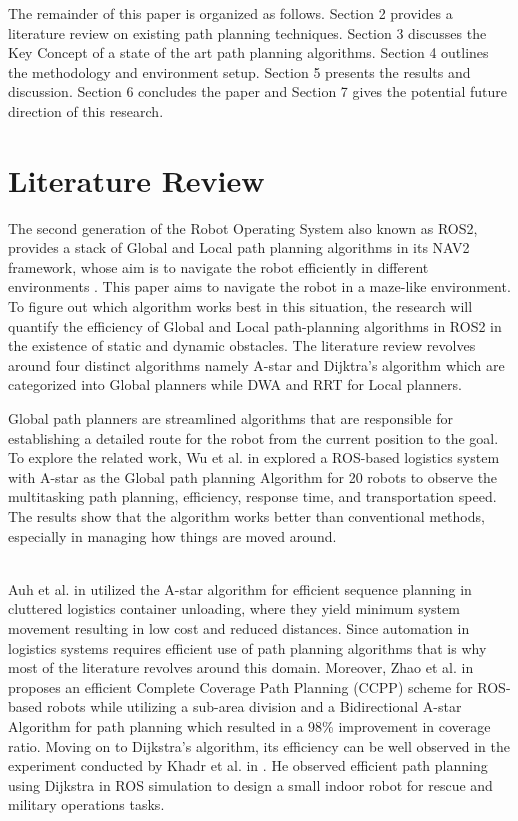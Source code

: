 \documentclass[sigconf]{acmart}
\begin{document}
The remainder of this paper is organized as follows. Section 2 provides a literature review on existing path planning techniques. Section 3 discusses the Key Concept of a state of the art path planning algorithms. Section 4 outlines the methodology and environment setup. Section 5 presents the results and discussion. Section 6 concludes the paper and Section 7 gives the potential future direction of this research.
\section{Literature Review}

The second generation of the Robot Operating System also known as ROS2, provides a stack of Global and Local path planning algorithms in its NAV2 framework, whose aim is to navigate the robot efficiently in different environments \cite{b14}. This paper aims to navigate the robot in a maze-like environment. To figure out which algorithm works best in this situation, the research will quantify the efficiency of Global and Local path-planning algorithms in ROS2 in the existence of static and dynamic obstacles. The literature review revolves around four distinct algorithms namely A-star and Dijktra's algorithm which are categorized into Global planners while DWA and RRT for Local planners.  

Global path planners are streamlined algorithms that are responsible for establishing a detailed route for the robot from the current position to the goal. To explore the related work, Wu et al. in \cite{b1} explored a ROS-based logistics system with A-star as the Global path planning Algorithm for 20 robots to observe the multitasking path planning, efficiency, response time, and transportation speed. The results show that the algorithm works better than conventional methods, especially in managing how things are moved around. 

\\
Auh et al. in \cite{b2} utilized the A-star algorithm for efficient sequence planning in cluttered logistics container unloading, where they yield minimum system movement resulting in low cost and reduced distances. Since automation in logistics systems requires efficient use of path planning algorithms that is why most of the literature revolves around this domain. Moreover, Zhao et al. in \cite{b3} proposes an efficient Complete Coverage Path Planning (CCPP) scheme for ROS-based robots while utilizing a sub-area division and a Bidirectional A-star Algorithm for path planning which resulted in a 98\% improvement in coverage ratio. Moving on to Dijkstra's algorithm, its efficiency can be well observed in the experiment conducted by Khadr et al. in \cite{b4}. He observed efficient path planning using Dijkstra in ROS simulation to design a small indoor robot for rescue and military operations tasks. 
\end{document}
